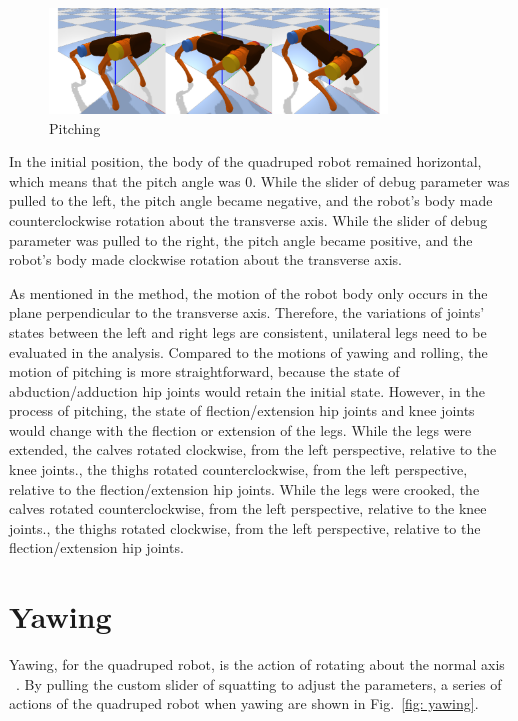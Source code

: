 \begin{figure}[htbp]
    \centering
    \includegraphics[width=0.8\textwidth]{figures/pitching.png}
    \caption{Pitching}
    \label{fig: pitching}
\end{figure}

In the initial position, the body of the quadruped robot remained horizontal, which means that the pitch angle was 0. While the slider of debug parameter was pulled to the left, the pitch angle became negative, and the robot's body made counterclockwise rotation about the transverse axis. While the slider of debug parameter was pulled to the right, the pitch angle became positive, and the robot's body made clockwise rotation about the transverse axis.

As mentioned in the method, the motion of the robot body only occurs in the plane perpendicular to the transverse axis. Therefore, the variations of joints' states between the left and right legs are consistent, unilateral legs need to be evaluated in the analysis. Compared to the motions of yawing and rolling, the motion of pitching is more straightforward, because the state of abduction/adduction hip joints would retain the initial state. However, in the process of pitching, the state of flection/extension hip joints and knee joints would change with the flection or extension of the legs. While the legs were extended, the calves rotated clockwise, from the left perspective, relative to the knee joints., the thighs rotated counterclockwise, from the left perspective, relative to the flection/extension hip joints. While the legs were crooked, the calves rotated counterclockwise, from the left perspective, relative to the knee joints., the thighs rotated clockwise, from the left perspective, relative to the flection/extension hip joints.





\section{Yawing}

Yawing, for the quadruped robot, is the action of rotating about the normal axis ~\cite{ref:6DOF}. By pulling the custom slider of squatting to adjust the parameters, a series of actions of the quadruped robot when yawing are shown in Fig.~\ref{fig: yawing}.

